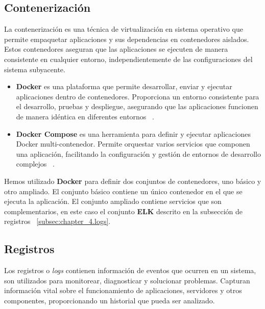\subsection*{Contenerización}

La contenerización es una técnica de virtualización en sistema operativo que permite empaquetar aplicaciones y
sus dependencias en contenedores aislados.
Estos contenedores aseguran que las aplicaciones se ejecuten de manera consistente en cualquier entorno,
independientemente de las configuraciones del sistema subyacente.

\begin{itemize}
    \item \textbf{Docker} es una plataforma que permite desarrollar, enviar y ejecutar aplicaciones dentro de
    contenedores.
    Proporciona un entorno consistente para el desarrollo, pruebas y despliegue, asegurando que las aplicaciones
    funcionen de manera idéntica en diferentes entornos ~\cite{https://docs.docker.com/}.
    \item \textbf{Docker Compose} es una herramienta para definir y ejecutar aplicaciones Docker multi-contenedor.
    Permite orquestar varios servicios que componen una aplicación, facilitando la configuración y gestión de entornos
    de desarrollo complejos ~\cite{https://docs.docker.com/compose/}.
\end{itemize}

Hemos utilizado \textbf{Docker} para definir dos conjuntos de contenedores, uno básico y otro ampliado.
El conjunto básico contiene un único contenedor en el que se ejecuta la aplicación.
El conjunto ampliado contiene servicios que son complementarios, en este caso el conjunto \textbf{ELK} descrito en la
subsección de registros ~\ref{subsec:chapter_4.logs}.

\subsection*{Registros}\label{subsec:chapter_4.logs}

Los registros o \textit{logs} contienen información de eventos que ocurren en un sistema, son utilizados para
monitorear, diagnosticar y solucionar problemas.
Capturan información vital sobre el funcionamiento de aplicaciones, servidores y otros componentes, proporcionando un
historial que pueda ser analizado.

